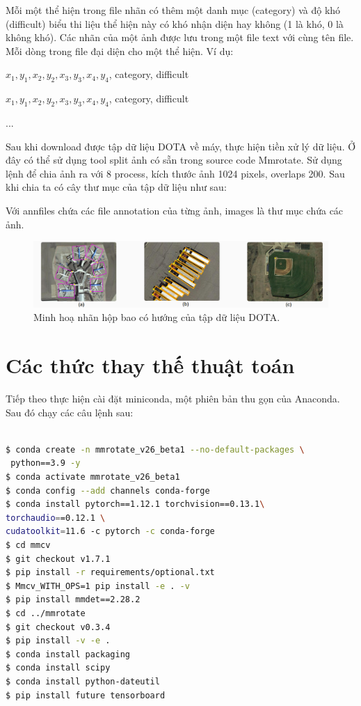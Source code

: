 \documentclass[12pt,a4paper,openany,oneside]{report}
\begin{document}
Mỗi một thể hiện trong file nhãn có thêm một danh mục (category) và độ khó (difficult) biểu thi liệu thể hiện này có khó nhận diện hay không (1 là khó, 0 là không khó). Các nhãn của một ảnh được lưu trong một file text với cùng tên file. Mỗi dòng trong file đại diện cho một thể hiện. Ví dụ:

$x_1, y_1, x_2, y_2, x_3, y_3, x_4, y_4$, category, difficult 

$x_1, y_1, x_2, y_2, x_3, y_3, x_4, y_4$, category, difficult 

...

Sau khi download được tập dữ liệu DOTA về máy, thực hiện tiền xử lý dữ liệu. Ở đây có thể sử dụng tool split ảnh có sẵn trong source code Mmrotate. Sử dụng lệnh để chia ảnh ra với 8 process, kích thước ảnh 1024 pixels, overlaps 200. Sau khi chia ta có cây thư mục của tập dữ liệu như sau:\\


Với annfiles chứa các file annotation của từng ảnh, images là thư mục chứa các ảnh.
\begin{figure}[ht!]
	\begin{center}
		\includegraphics[width=445px]{./minh_hoa_hop_bao_dota.jpg}
		\caption{Minh hoạ nhãn hộp bao có hướng của tập dữ liệu DOTA.}
		\label{minh_hoa_hop_bao_dota}
	\end{center}
\end{figure} 
\section{Các thức thay thế thuật toán}

Tiếp theo thực hiện cài đặt miniconda, một phiên bản thu gọn của Anaconda. Sau đó chạy các câu lệnh sau:

\begin{lstlisting}[language=bash, caption={Mô tả lệnh command line để tạo môi trường ảo}, label={lst:command-line}]

$ conda create -n mmrotate_v26_beta1 --no-default-packages \
 python==3.9 -y 
$ conda activate mmrotate_v26_beta1 
$ conda config --add channels conda-forge 
$ conda install pytorch==1.12.1 torchvision==0.13.1\ 
torchaudio==0.12.1 \
cudatoolkit=11.6 -c pytorch -c conda-forge 
$ cd mmcv
$ git checkout v1.7.1
$ pip install -r requirements/optional.txt 
$ Mmcv_WITH_OPS=1 pip install -e . -v 
$ pip install mmdet==2.28.2 
$ cd ../mmrotate 
$ git checkout v0.3.4
$ pip install -v -e . 
$ conda install packaging 
$ conda install scipy 
$ conda install python-dateutil
$ pip install future tensorboard

\end{lstlisting}
\end{document}
